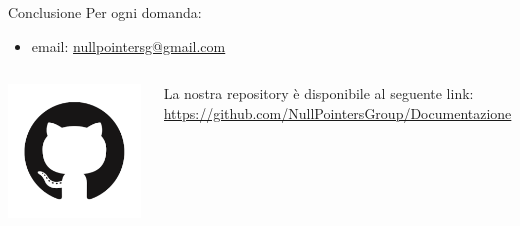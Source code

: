 \documentclass[11pt]{beamer}
\begin{document}
\begin{frame}{Conclusione}
 Per ogni domanda:
 \begin{itemize}
  \item email: \href{mailto:nullpointersg@gmail.com}{nullpointersg@gmail.com}
 \end{itemize}
 
 \begin{columns}
  \begin{column}{0.15\textwidth}
   \includegraphics[width=0.99\textwidth]{logo_github}
  \end{column}
  \begin{column}{0.85\textwidth}
   La nostra repository è disponibile al seguente link: \url{https://github.com/NullPointersGroup/Documentazione}
  \end{column}
 \end{columns}
\end{frame}
\end{document}
